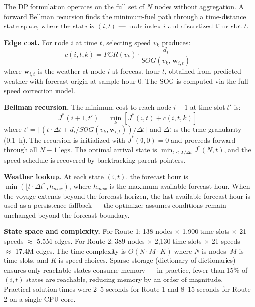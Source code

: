 \documentclass[review]{elsarticle}
\begin{document}
The DP formulation operates on the full set of $N$ nodes without aggregation. A forward Bellman recursion finds the minimum-fuel path through a time-distance state space, where the state is $(i, t)$ --- node index $i$ and discretized time slot $t$.

\textbf{Edge cost.} For node $i$ at time $t$, selecting speed $v_k$ produces:
\begin{equation}
    c(i, t, k) = FCR(v_k) \cdot \frac{d_i}{SOG(v_k,\, \mathbf{w}_{i,t})}
    \label{eq:dp-cost}
\end{equation}
where $\mathbf{w}_{i,t}$ is the weather at node $i$ at forecast hour $t$, obtained from predicted weather with forecast origin at sample hour 0. The SOG is computed via the full speed correction model.

\textbf{Bellman recursion.} The minimum cost to reach node $i+1$ at time slot $t'$ is:
\begin{equation}
    J^*(i+1, t') = \min_{k} \left[ J^*(i, t) + c(i, t, k) \right]
    \label{eq:bellman}
\end{equation}
where $t' = \lceil (t \cdot \Delta t + d_i / SOG(v_k, \mathbf{w}_{i,t})) / \Delta t \rceil$ and $\Delta t$ is the time granularity (0.1~h). The recursion is initialized with $J^*(0, 0) = 0$ and proceeds forward through all $N-1$ legs. The optimal arrival state is $\min_{t \leq T/\Delta t} J^*(N, t)$, and the speed schedule is recovered by backtracking parent pointers.

\textbf{Weather lookup.} At each state $(i, t)$, the forecast hour is $\min(\lfloor t \cdot \Delta t \rceil, h_{max})$, where $h_{max}$ is the maximum available forecast hour. When the voyage extends beyond the forecast horizon, the last available forecast hour is used as a persistence fallback --- the optimizer assumes conditions remain unchanged beyond the forecast boundary.

\textbf{State space and complexity.} For Route 1: 138 nodes $\times$ 1,900 time slots $\times$ 21 speeds $\approx$ 5.5M edges. For Route 2: 389 nodes $\times$ 2,130 time slots $\times$ 21 speeds $\approx$ 17.4M edges. The time complexity is $O(N \cdot M \cdot K)$ where $N$ is nodes, $M$ is time slots, and $K$ is speed choices. Sparse storage (dictionary of dictionaries) ensures only reachable states consume memory --- in practice, fewer than 15\% of $(i, t)$ states are reachable, reducing memory by an order of magnitude. Practical solution times were 2--5 seconds for Route 1 and 8--15 seconds for Route 2 on a single CPU core.
\end{document}
